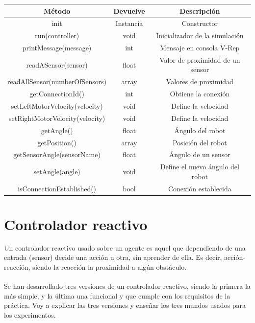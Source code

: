 \documentclass[14pt]{extarticle}
\theoremstyle{definition}
\theoremstyle{remark}
\begin{document}
\begin{tabular}{|c|c|c|}
\hline 
Método & Devuelve & Descripción \\ 
\hline 
init & Instancia & Constructor \\ 
\hline 
run(controller) & void & Inicializador de la simulación \\ 
\hline 
printMessage(message) & int & Mensaje en consola V-Rep \\ 
\hline 
readASensor(sensor) & float & Valor de proximidad de un sensor \\ 
\hline 
readAllSensor(numberOfSensors) & array & Valores de proximidad \\ 
\hline 
getConnectionId() & int & Obtiene la conexión \\ 
\hline 
setLeftMotorVelocity(velocity) & void & Define la velocidad \\ 
\hline 
setRightMotorVelocity(velocity) & void & Define la velocidad \\ 
\hline 
getAngle() & float & Ángulo del robot \\ 
\hline 
getPosition() & array & Posición del robot \\ 
\hline 
getSensorAngle(sensorName) & float & Ángulo de un sensor \\ 
\hline 
setAngle(angle) & void & Define el nuevo ángulo del robot \\ 
\hline 
isConnectionEstablished() & bool & Conexión establecida \\ 
\hline 
\end{tabular} 
\newpage
\section{Controlador reactivo}\label{sec:controladorreactivo}
Un controlador reactivo usado sobre un agente es aquel que dependiendo de una entrada (sensor) decide una acción u otra, sin aprender de ella. Es decir, acción-reacción, siendo la reacción la proximidad a algún obstáculo.\\\\
Se han desarrollado tres versiones de un controlador reactivo, siendo la primera la más simple, y la última una funcional y que cumple con los requisitos de la práctica. Voy a explicar las tres versiones y enseñar los tres mundos usados para los experimentos.
\end{document}
